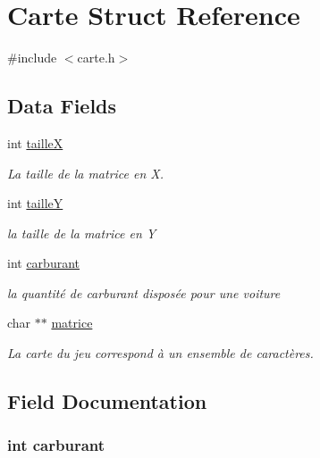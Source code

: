 \hypertarget{struct_carte}{\section{Carte Struct Reference}
\label{struct_carte}
}


{\ttfamily \#include $<$carte.\-h$>$}

\subsection*{Data Fields}
\begin{DoxyCompactItemize}
\item 
int \hyperlink{struct_carte_afdf3d36b301d88596fa665cd22ff06aa}{taille\-X}
\begin{DoxyCompactList}\small\item\em La taille de la matrice en X. \end{DoxyCompactList}\item 
int \hyperlink{struct_carte_a24c31ab56ac04191ff18cbe37bb9b168}{taille\-Y}
\begin{DoxyCompactList}\small\item\em la taille de la matrice en Y \end{DoxyCompactList}\item 
int \hyperlink{struct_carte_a9d4300c17f0ec183157f3d7f87bd555a}{carburant}
\begin{DoxyCompactList}\small\item\em la quantité de carburant disposée pour une voiture \end{DoxyCompactList}\item 
char $\ast$$\ast$ \hyperlink{struct_carte_a82035e42cf92072f1c0924addca5a624}{matrice}
\begin{DoxyCompactList}\small\item\em La carte du jeu correspond à un ensemble de caractères. \end{DoxyCompactList}\end{DoxyCompactItemize}


\subsection{Field Documentation}
\hypertarget{struct_carte_a9d4300c17f0ec183157f3d7f87bd555a}{
\subsubsection[{carburant}]{\setlength{\rightskip}{0pt plus 5cm}int carburant}}\label{struct_carte_a9d4300c17f0ec183157f3d7f87bd555a}


